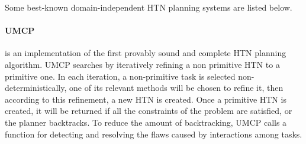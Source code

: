 Some best-known domain-independent HTN planning systems are listed below.
\paragraph*{UMCP}
\label{sec:UMCP}
\cite{3} \cite{3_1} \cite[p. 174]{1} is an implementation of the first provably sound and complete HTN planning algorithm. UMCP searches by iteratively refining a non primitive HTN to a primitive one. In each iteration, a non-primitive task is selected non-deterministically, one of its relevant methods will be chosen to refine it, then according to this refinement, a new HTN is created. Once a primitive HTN is created, it will be returned if all the constraints of the problem are satisfied, or the planner backtracks. To reduce the amount of backtracking, UMCP calls a function for detecting and resolving the flaws caused by interactions among tasks.




